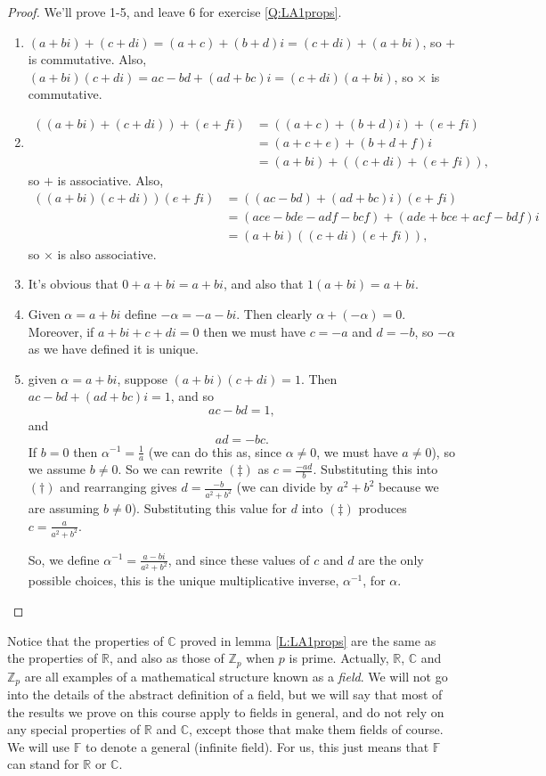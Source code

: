 \documentclass{article}
\theoremstyle{plain}
\newcommand{\bZ}{\mathbb{Z}}
\newcommand{\bC}{\mathbb{C}}
\newcommand{\bR}{\mathbb{R}}
\newcommand{\bF}{\mathbb{F}}
\begin{document}
\begin{proof}
We'll prove 1-5, and leave 6 for exercise \ref{Q:LA1props}. 
\begin{enumerate}[1)]
\item $(a+ bi) + (c+di) = (a+c) + (b+d)i = ( c+di) + (a+ bi)$, so $+$ is commutative. Also, $(a+ bi)(c+di) = ac - bd +(ad+bc)i = (c+di)(a+ bi)$, so $\times$ is commutative.
\item \begin{align*}((a+ bi) + (c+di)) + (e+fi) &= ((a+c) + (b+d)i) + (e+fi)\\
 &= (a+c+e)+(b+d+f)i\\
&= (a+ bi) + ((c+di) + (e+fi)),\end{align*} so $+$ is associative. Also, 
\begin{align*}((a+ bi)(c+di))(e+fi) &= ((ac - bd) +(ad+bc)i)(e+fi)\\ 
&= (ace - bde -adf - bcf) +(ade +bce + acf - bdf)i \\
&= (a+ bi)((c+di)(e+fi)),\end{align*}
so $\times$ is also associative.
\item It's obvious that $0 + a + bi = a+ bi$, and also that $1(a+bi) = a+bi$.
\item Given $\alpha = a + bi$ define $-\alpha= -a - bi$. Then clearly $\alpha +(-\alpha) = 0$. Moreover, if $a + bi + c +di = 0$ then we must have $c = - a$ and $d = -b$, so $-\alpha$ as we have defined it is unique.
\item given $\alpha = a + bi$, suppose $(a+bi)(c+di) = 1$. Then $ac - bd + (ad + bc)i = 1$, and so 
\[\tag{$\dagger$}ac - bd = 1,\]
and 
\[\tag{$\ddagger$}ad = - bc.\] If $b = 0 $ then $\alpha^{-1}=\frac{1}{a}$ (we can do this as, since $\alpha\neq 0$, we must have $a\neq 0$), so we assume $b\neq 0$. So we can rewrite $(\ddagger)$ as $c = \frac{-ad}{b}$. Substituting this into $(\dagger)$ and rearranging gives $d = \frac{-b}{a^2+ b^2}$ (we can divide by $a^2+b^2$ because we are assuming $b\neq 0$). Substituting this value for $d$ into $(\ddagger)$ produces $c = \frac{a}{a^2+b^2}$. 

So, we define $\alpha^{-1} = \frac{a-bi}{a^2+b^2}$, and since these values of $c$ and $d$ are the only possible choices, this is the unique multiplicative inverse, $\alpha^{-1}$, for $\alpha$.   
\end{enumerate}
\end{proof}

Notice that the properties of $\bC$ proved in lemma \ref{L:LA1props} are the same as the properties of $\bR$, and also as those of $\bZ_p$ when $p$ is prime. Actually, $\bR$, $\bC$ and $\bZ_p$ are all examples of a mathematical structure known as a \emph{field}. We will not go into the details of the abstract definition of a field, but we will say that most of the results we prove on this course apply to fields in general, and do not rely on any special properties of $\bR$ and $\bC$, except those that make them fields of course. We will use $\bF$ to denote a general (infinite field). For us, this just means that $\bF$ can stand for $\bR$ or $\bC$. 
\end{document}
